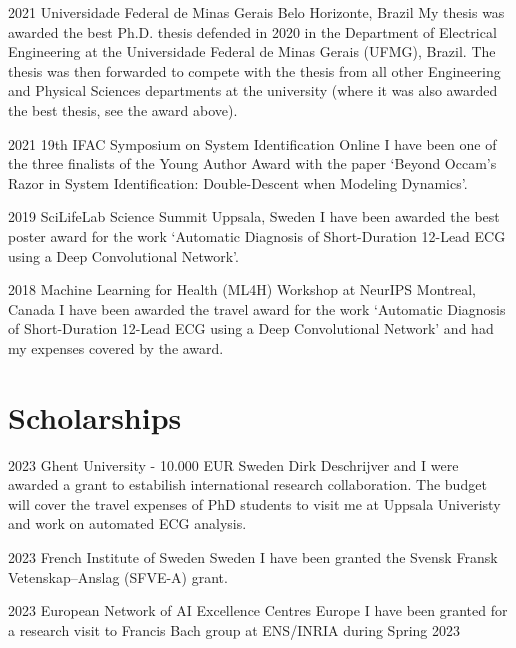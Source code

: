 \documentclass[10pt,letterpaper]{article} %
\begin{document}
    { 2021 }
    { Universidade Federal de Minas Gerais }
    { Belo Horizonte, Brazil }
    { My thesis was awarded the best Ph.D. thesis defended in 2020 in the Department of Electrical Engineering at the Universidade Federal de Minas Gerais (UFMG), Brazil. The thesis was then forwarded to compete with the thesis from all other Engineering and Physical Sciences departments at the university (where it was also awarded the best thesis, see the award above). }

    { 2021 }
    { 19th IFAC Symposium on System Identification }
    { Online }
    { I have been one of the three finalists of the Young Author Award with the paper `Beyond Occam’s Razor in System Identification:  Double-Descent when Modeling Dynamics'. }

    { 2019 }
    { SciLifeLab Science Summit }
    { Uppsala, Sweden }
    { I have been awarded the best poster award for the work `Automatic Diagnosis of Short-Duration 12-Lead ECG using a Deep Convolutional Network'. }

    { 2018 }
    { Machine Learning for Health (ML4H) Workshop at NeurIPS }
    { Montreal, Canada }
    { I have been awarded the travel award for the work `Automatic Diagnosis of Short-Duration 12-Lead ECG using a Deep Convolutional Network' and had my expenses covered by the award. }


\section*{Scholarships}


    { 2023 }
    { Ghent University - 10.000 EUR }
    { Sweden }
    { Dirk Deschrijver and I were awarded a grant to estabilish international research collaboration. The budget will cover the travel expenses of PhD students to visit me at Uppsala Univeristy and work on automated ECG analysis. }

    { 2023 }
    { French Institute of Sweden }
    { Sweden }
    { I have been granted the Svensk Fransk Vetenskap–Anslag (SFVE-A) grant. }

    { 2023 }
    { European Network of AI Excellence Centres }
    { Europe }
    { I have been granted for a research visit to Francis Bach group at ENS/INRIA during Spring 2023 }
\end{document}
